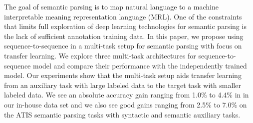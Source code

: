 The goal of semantic parsing is to map natural language to a machine interpretable meaning representation language (MRL). One of the constraints that limits full exploration of deep learning technologies for semantic parsing is the lack of sufficient annotation training data. In this paper, we propose using sequence-to-sequence in a multi-task setup for semantic parsing with focus on transfer learning. We explore three multi-task architectures for sequence-to-sequence model and compare their performance with the independently trained model. Our experiments show that the multi-task setup aids transfer learning from an auxiliary task with large labeled data to the target task with smaller labeled data. We see an absolute accuracy gain ranging from 1.0\% to 4.4\% in in our in-house data set and we also see good gains ranging from 2.5\% to 7.0\% on the ATIS semantic parsing tasks with syntactic and semantic auxiliary tasks.
